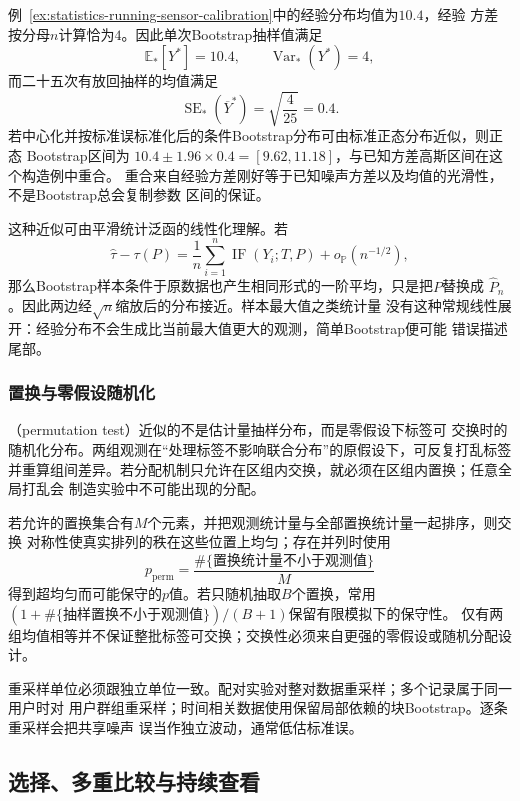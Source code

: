 例~\ref{ex:statistics-running-sensor-calibration}中的经验分布均值为\(10.4\)，经验
方差按分母\(n\)计算恰为\(4\)。因此单次Bootstrap抽样值满足
\[
  \mathbb{E}_\ast[Y^\ast]=10.4,\qquad
  \operatorname{Var}_\ast(Y^\ast)=4,
\]
而二十五次有放回抽样的均值满足
\[
  \operatorname{SE}_\ast(\overline Y^\ast)
  =
  \sqrt{\frac4{25}}=0.4.
\]
若中心化并按标准误标准化后的条件Bootstrap分布可由标准正态分布近似，则正态
Bootstrap区间为
\(10.4\pm1.96\times0.4=[9.62,11.18]\)，与已知方差高斯区间在这个构造例中重合。
重合来自经验方差刚好等于已知噪声方差以及均值的光滑性，不是Bootstrap总会复制参数
区间的保证。

这种近似可由平滑统计泛函的线性化理解。若
\[
  \widehat\tau-\tau(P)
  =
  \frac1n\sum_{i=1}^n\operatorname{IF}(Y_i;T,P)
  +o_{\mathbb{P}}(n^{-1/2}),
\]
那么Bootstrap样本条件于原数据也产生相同形式的一阶平均，只是把\(P\)替换成
\(\widehat P_n\)。因此两边经\(\sqrt n\)缩放后的分布接近。样本最大值之类统计量
没有这种常规线性展开：经验分布不会生成比当前最大值更大的观测，简单Bootstrap便可能
错误描述尾部。

\subsubsection{置换与零假设随机化}

（permutation test）近似的不是估计量抽样分布，而是零假设下标签可
交换时的随机化分布。两组观测在“处理标签不影响联合分布”的原假设下，可反复打乱标签
并重算组间差异。若分配机制只允许在区组内交换，就必须在区组内置换；任意全局打乱会
制造实验中不可能出现的分配。

若允许的置换集合有\(M\)个元素，并把观测统计量与全部置换统计量一起排序，则交换
对称性使真实排列的秩在这些位置上均匀；存在并列时使用
\[
  p_{\mathrm{perm}}
  =\frac{\#\{\text{置换统计量不小于观测值}\}}{M}
\]
得到超均匀而可能保守的\(p\)值。若只随机抽取\(B\)个置换，常用
\((1+\#\{\text{抽样置换不小于观测值}\})/(B+1)\)保留有限模拟下的保守性。
仅有两组均值相等并不保证整批标签可交换；交换性必须来自更强的零假设或随机分配设计。

重采样单位必须跟独立单位一致。配对实验对整对数据重采样；多个记录属于同一用户时对
用户群组重采样；时间相关数据使用保留局部依赖的块Bootstrap。逐条重采样会把共享噪声
误当作独立波动，通常低估标准误。

\subsection{选择、多重比较与持续查看}
\label{sec:statistics-selection-multiplicity}

